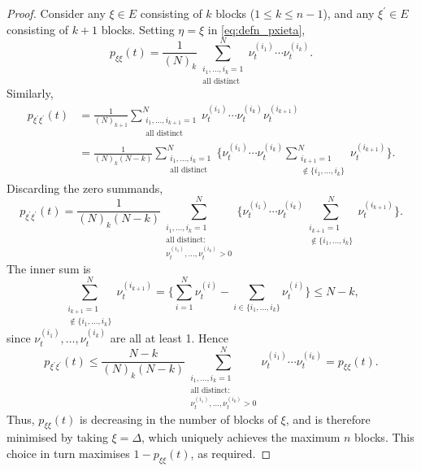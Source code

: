 \documentclass[12pt,authoryear]{article}
\theoremstyle{definition}
\newcommand{\1}[1]{\mathbbm{1}_{#1}}
\begin{document}
\begin{proof}
Consider any $\xi \in E$ consisting of $k$ blocks ($1\leq k\leq n-1$), and any $\xi^\prime\in E$ consisting of $k+1$ blocks. 
Setting $\eta=\xi$ in \eqref{eq:defn_pxieta},
\begin{equation*}
p_{\xi\xi}(t) 
= \frac{1}{(N)_k} \sum_{\substack{i_1,\dots,i_k=1 \\ \text{all distinct}}}^N 
        \nu_t^{(i_1)} \cdots \nu_t^{(i_k)} .
\end{equation*}
Similarly,
\begin{align*}
p_{\xi^\prime\xi^\prime}(t) &= \frac{1}{(N)_{k+1}} 
        \sum_{\substack{i_1,\dots, i_{k+1} =1 \\ \text{all distinct}}}^N 
        \nu_t^{(i_1)} \cdots \nu_t^{(i_k)} \nu_t^{(i_{k+1})} \\
&= \frac{1}{(N)_k(N-k)} \sum_{\substack{i_1,\dots,i_k =1 \\ \text{all distinct}}}^N 
        \Bigg\{ \nu_t^{(i_1)} \cdots \nu_t^{(i_k)} 
        \sum_{\substack{i_{k+1}=1 \\ \notin \{i_1,\ldots, i_k\} }}^N 
        \nu_t^{(i_{k+1})} \Bigg\} .
\end{align*}
Discarding the zero summands,
\begin{equation*}
p_{\xi^\prime\xi^\prime}(t) 
    = \frac{1}{(N)_k(N-k)} \sum_{\substack{i_1,\dots,i_k =1 \\ \text{all distinct:} 
        \\ \nu_t^{(i_1)},\dots,\nu_t^{(i_k)} > 0 }}^N
        \Bigg\{ \nu_t^{(i_1)} \cdots \nu_t^{(i_k)} 
        \sum_{\substack{i_{k+1}=1 \\ \notin \{i_1,\ldots, i_k\} }}^N 
        \nu_t^{(i_{k+1})} \Bigg\} .
\end{equation*}
The inner sum is
\begin{equation*}
\sum_{\substack{i_{k+1}=1 \\ \notin \{i_1,\ldots, i_k\} }}^N \nu_t^{(i_{k+1})} 
    = \Bigg\{ \sum_{i=1}^N \nu_t^{(i)} -  \sum_{i\in\{i_1,\dots,i_k\} } 
        \nu_t^{(i)} \Bigg\}
    \leq N - k ,
\end{equation*}
since $\nu_t^{(i_1)},\dots,\nu_t^{(i_k)} $ are all at least 1.
Hence
\begin{equation*}
p_{\xi^\prime\xi^\prime}(t)
    \leq  \frac{N-k}{(N)_k(N-k)} \sum_{\substack{i_1,\dots,i_k =1 
        \\ \text{all distinct:} \\ \nu_t^{(i_1)},\dots,\nu_t^{(i_k)} > 0 }}^N 
        \nu_t^{(i_1)} \cdots \nu_t^{(i_k)} 
    = p_{\xi\xi}(t) .
\end{equation*}
Thus, $p_{\xi\xi}(t)$ is decreasing in the number of blocks of $\xi$, and is therefore minimised by taking $\xi = \Delta$, which uniquely achieves the maximum $n$ blocks. This choice in turn maximises $1-p_{\xi\xi}(t)$, as required.
\end{proof}
\end{document}
